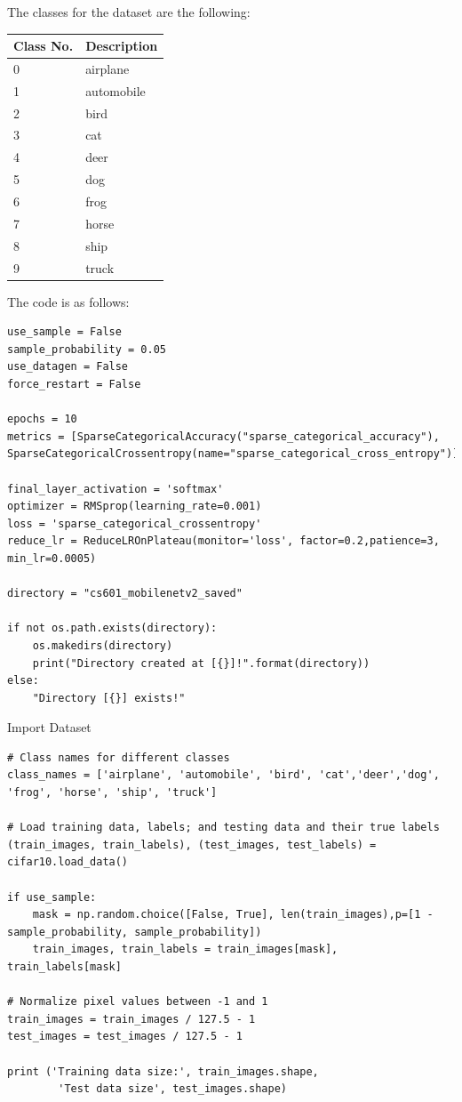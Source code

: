 \documentclass[12pt, letterpaper]{article}
\begin{document}
The classes for the dataset are the following:

\begin{tabular}{ll}
\hline
\textbf{Class No.} & \textbf{Description}\\
\hline
0&airplane\\
1&automobile\\
2&bird\\
3&cat\\
4&deer\\
5&dog\\
6&frog\\
7&horse\\
8&ship\\
9&truck\\
\end{tabular}

The code is as follows:

\begin{mdframed}[backgroundcolor=bg]
\begin{verbatim}
use_sample = False
sample_probability = 0.05
use_datagen = False
force_restart = False

epochs = 10
metrics = [SparseCategoricalAccuracy("sparse_categorical_accuracy"), SparseCategoricalCrossentropy(name="sparse_categorical_cross_entropy")]

final_layer_activation = 'softmax'
optimizer = RMSprop(learning_rate=0.001)
loss = 'sparse_categorical_crossentropy'
reduce_lr = ReduceLROnPlateau(monitor='loss', factor=0.2,patience=3, min_lr=0.0005)

directory = "cs601_mobilenetv2_saved"

if not os.path.exists(directory):
    os.makedirs(directory)
    print("Directory created at [{}]!".format(directory))
else:
    "Directory [{}] exists!"
\end{verbatim}
\end{mdframed}

{\large Import Dataset}

\begin{mdframed}[backgroundcolor=bg]
\begin{verbatim}
# Class names for different classes
class_names = ['airplane', 'automobile', 'bird', 'cat','deer','dog', 'frog', 'horse', 'ship', 'truck']

# Load training data, labels; and testing data and their true labels
(train_images, train_labels), (test_images, test_labels) = cifar10.load_data()

if use_sample:
    mask = np.random.choice([False, True], len(train_images),p=[1 - sample_probability, sample_probability])
    train_images, train_labels = train_images[mask], train_labels[mask]

# Normalize pixel values between -1 and 1
train_images = train_images / 127.5 - 1 
test_images = test_images / 127.5 - 1 

print ('Training data size:', train_images.shape, 
        'Test data size', test_images.shape)
\end{verbatim}
\end{mdframed}
\end{document}
